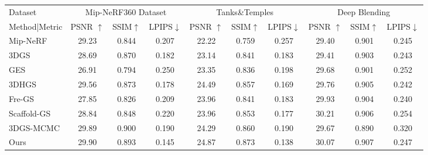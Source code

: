 \providecommand{\cite}[1]{}
\providecommand{\citet}[1]{}
\providecommand{\citep}[1]{}
\providecommand{\citeyear}[1]{}
\providecommand{\citeauthor}[1]{}
\providecommand{\citealp}[1]{}
\providecommand{\citealt}[1]{}
\providecommand{\ref}[1]{}
\setlength{\pdfpagewidth}{8.5in} %
\setlength{\pdfpageheight}{11in} %
%
\begin{tabular}{l|ccc|ccc|ccc}
\bottomrule
    Dataset & \multicolumn{3}{c|}{Mip-NeRF360 Dataset}  & \multicolumn{3}{c|}{Tanks\&Temples} & \multicolumn{3}{c}{Deep Blending}\\
    Method|Metric & PSNR $\uparrow$   & SSIM$\uparrow$   & LPIPS$\downarrow$ & PSNR $\uparrow$   & SSIM$\uparrow$   & LPIPS$\downarrow$ & PSNR $\uparrow$   & SSIM$\uparrow$   & LPIPS$\downarrow$ \\
    \hline
    Mip-NeRF & 29.23 & 0.844 & 0.207 & 22.22 & 0.759 & 0.257 & 29.40 & 0.901 & 0.245\\
    3DGS & 28.69 & 0.870 & \cellcolor{yellow!40}0.182 & 23.14 & 0.841 & 0.183 & 29.41 & 0.903 & \cellcolor{yellow!40}0.243\\
    GES & 26.91 & 0.794 & 0.250 & 23.35 & 0.836 & 0.198 & 29.68 & 0.901 & 0.252\\
    3DHGS & \cellcolor{yellow!40}29.56 & \cellcolor{yellow!40}0.873 & \cellcolor{orange!40}0.178 & \cellcolor{orange!40}24.49 & \cellcolor{yellow!40}0.857 & \cellcolor{orange!40}0.169 & 29.76 & \cellcolor{yellow!40}0.905 & \cellcolor{orange!40}0.242\\
    Fre-GS & 27.85 & 0.826 & 0.209 & 23.96 & 0.841 & 0.183 & \cellcolor{yellow!40}29.93 & 0.904 & \cellcolor{red!40}0.240\\
    Scaffold-GS & 28.84 & 0.848 & 0.220 & 23.96 & 0.853 & \cellcolor{yellow!40}0.177 & \cellcolor{red!40}30.21 & \cellcolor{orange!40}0.906 & 0.254\\
    3DGS-MCMC & \cellcolor{orange!40}29.89 & \cellcolor{red!40}0.900 & 0.190 & \cellcolor{yellow!40}24.29 & \cellcolor{orange!40}0.860 & 0.190 & 29.67 & 0.890 & 0.320\\
    \midrule
    Ours & \cellcolor{red!40}29.90 & \cellcolor{orange!40}0.893 & \cellcolor{red!40}0.145 & \cellcolor{red!40}24.87 & \cellcolor{red!40} 0.873 & \cellcolor{red!40} 0.138 & \cellcolor{orange!40}30.07 & \cellcolor{red!40}0.907 & 0.247\\
    \bottomrule
\end{tabular}




